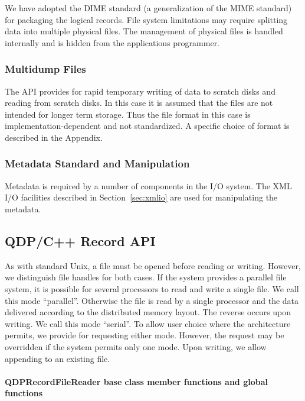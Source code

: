 \documentclass[12pt,letterpaper]{article}
\begin{document}
We have adopted the DIME standard (a generalization of the MIME
standard) for packaging the logical records.  File system limitations
may require splitting data into multiple physical files.  The
management of physical files is handled internally and is hidden from
the applications programmer.

\subsubsection{Multidump Files}

The API provides for rapid temporary writing of data to scratch disks
and reading from scratch disks.  In this case it is assumed that the
files are not intended for longer term storage.  Thus the file format
in this case is implementation-dependent and not standardized.  A
specific choice of format is described in the Appendix.

\subsubsection{Metadata Standard and Manipulation}

Metadata is required by a number of components in the I/O system. 
The XML I/O facilities described in Section~\ref{sec:xmlio} are used
for manipulating the metadata.

\subsection{QDP/C++ Record API}

As with standard Unix, a file must be opened before reading or
writing.  However, we distinguish file handles for both cases.  If the
system provides a parallel file system, it is possible for several
processors to read and write a single file. We call this mode
``parallel''.  Otherwise the file is read by a single processor and
the data delivered according to the distributed memory layout.  The
reverse occurs upon writing. We call this mode ``serial''. To allow
user choice where the architecture permits, we provide for requesting
either mode.  However, the request may be overridden if the system
permits only one mode.  Upon writing, we allow appending to an
existing file.

\paragraph{QDPRecordFileReader base class member functions and global functions}
\end{document}
